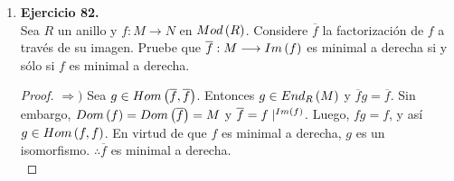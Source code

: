 \documentclass{article}
\begin{document}
\begin{enumerate}
\begin{proof}
		Por otro lado, dado que $Im\lrprth{\varphi}\subseteq\ringcenter{\Lambda}$, podemos definir sobre $M$ una acción 
		\begin{align*}
			\descapp{*}{M \times R}{M}{\lrprth{m,r}}{m*r=\varphi\lrprth{r}m}{}
		\end{align*}
		Más aún, bajo esta acción, heredada por la acción de $\Lambda$, $M$ es un $R$-módulo a izquierda, del cuál bastará probar la propiedad: $m*\lrprth{rs}=\lrprth{m*r}*s,\ \forall r,s,m$. En efecto, si $r,s \in R$, $m \in M$, entonces
		\begin{align*}
			m*\lrprth{rs}&=\varphi\lrprth{rs}m\\
			&=\varphi\lrprth{r}\varphi\lrprth{s}m\\
			&=\varphi\lrprth{s}\varphi\lrprth{r}m\\
			&=[\varphi\lrprth{r}m]*s\\
			&=\lrprth{m*r}*s
		\end{align*}
		Por consiguiente, $M \in {}_{\Lambda - R}Mod \cap {}_{R}Mod_{R}$.\\
		
		Por último, mediante el funtor de cambio de anillos
		\begin{align*}
			F_{\varphi}:Mod\lrprth{\Lambda}\longrightarrow Mod\lrprth{R}
		\end{align*}
		tenemos que todo $\Lambda$-módulo a izquierda es un $R$-módulo a izquierda y todo morfismo de $\Lambda$-módulos es, a su vez, un morfismo de $R$-módulos.\\
		$\therefore Mod\lrprth{\Lambda}$ es una subcategoría de $Mod\lrprth{R}$.
	\end{proof}
	
	\item \textbf{Ejercicio 82.}\\
	Sea $R$ un anillo y $f:M \longrightarrow N$ en $Mod\lrprth{R}$. Considere $\overline{f}$ la factorización de $f$ a través de su imagen. Pruebe que $\overline{f}:M \longrightarrow Im\left(f\right)$ es minimal a derecha si y sólo si $f$ es minimal a derecha.
	\begin{proof}
		$\boxed{\Rightarrow )}$ Sea $g \in Hom\left(\overline{f},\overline{f}\right)$. Entonces $g \in End_{R}\left(M\right)$ y $\overline{f}g=\overline{f}$. Sin embargo, $Dom\left(f\right)=Dom\left(\overline{f}\right)=M$ y $\overline{f}=f\mid^{Im\left(f\right)}$. Luego, $fg=f$, y así $g \in Hom\left(f,f\right)$. En virtud de que $f$ es minimal a derecha, $g$ es un isomorfismo. $\therefore\overline{f}$ es minimal a derecha.\\
		

\end{proof}
\end{enumerate}
\end{document}
